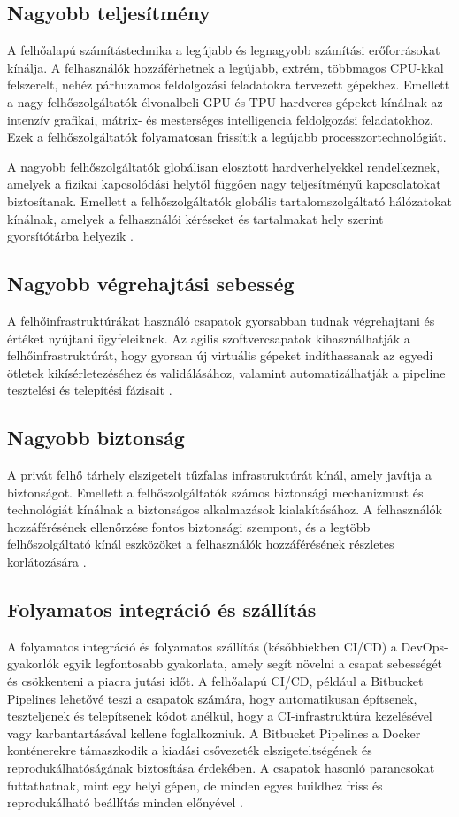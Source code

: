 \subsection*{Nagyobb teljesítmény}
A felhőalapú számítástechnika a legújabb és legnagyobb számítási erőforrásokat kínálja.
A felhasználók hozzáférhetnek a legújabb, extrém, többmagos CPU-kkal felszerelt, nehéz párhuzamos feldolgozási feladatokra tervezett gépekhez.
Emellett a nagy felhőszolgáltatók élvonalbeli GPU és TPU hardveres gépeket kínálnak az intenzív grafikai, mátrix- és mesterséges intelligencia feldolgozási feladatokhoz.
Ezek a felhőszolgáltatók folyamatosan frissítik a legújabb processzortechnológiát.

A nagyobb felhőszolgáltatók globálisan elosztott hardverhelyekkel rendelkeznek, amelyek a fizikai kapcsolódási helytől függően nagy teljesítményű kapcsolatokat biztosítanak.
Emellett a felhőszolgáltatók globális tartalomszolgáltató hálózatokat kínálnak, amelyek a felhasználói kéréseket és tartalmakat hely szerint gyorsítótárba helyezik \cite{cloudComp}.

\subsection*{Nagyobb végrehajtási sebesség}
A felhőinfrastruktúrákat használó csapatok gyorsabban tudnak végrehajtani és értéket nyújtani ügyfeleiknek.
Az agilis szoftvercsapatok kihasználhatják a felhőinfrastruktúrát, hogy gyorsan új virtuális gépeket indíthassanak az egyedi ötletek kikísérletezéséhez és validálásához, valamint automatizálhatják a pipeline tesztelési és telepítési fázisait \cite{cloudComp}.

\subsection*{Nagyobb biztonság}
A privát felhő tárhely elszigetelt tűzfalas infrastruktúrát kínál, amely javítja a biztonságot.
Emellett a felhőszolgáltatók számos biztonsági mechanizmust és technológiát kínálnak a biztonságos alkalmazások kialakításához.
A felhasználók hozzáférésének ellenőrzése fontos biztonsági szempont, és a legtöbb felhőszolgáltató kínál eszközöket a felhasználók hozzáférésének részletes korlátozására \cite{cloudComp}.

\subsection*{Folyamatos integráció és szállítás}
A folyamatos integráció és folyamatos szállítás (későbbiekben CI/CD) a DevOps-gyakorlók egyik legfontosabb gyakorlata, amely segít növelni a csapat sebességét és csökkenteni a piacra jutási időt.
A felhőalapú CI/CD, például a Bitbucket Pipelines lehetővé teszi a csapatok számára, hogy automatikusan építsenek, teszteljenek és telepítsenek kódot anélkül, hogy a CI-infrastruktúra kezelésével vagy karbantartásával kellene foglalkozniuk.
A Bitbucket Pipelines a Docker konténerekre támaszkodik a kiadási csővezeték elszigeteltségének és reprodukálhatóságának biztosítása érdekében.
A csapatok hasonló parancsokat futtathatnak, mint egy helyi gépen, de minden egyes buildhez friss és reprodukálható beállítás minden előnyével \cite{cloudComp}.

